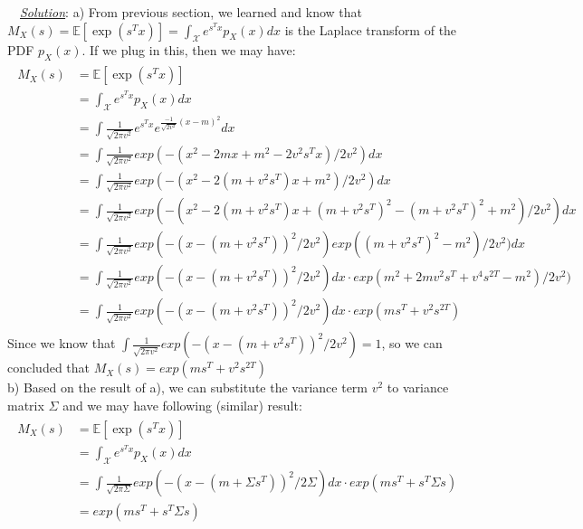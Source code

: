 \documentclass[twoside]{article}
\newenvironment{solution}{
  \begin{flushleft} \noindent ~~\underline{\emph{Solution}}: \rmfamily}{\end{flushleft}}
\newcommand\E{\mathbb{E}}
\begin{document}
\begin{solution}
a) From previous section, we learned and know that $M_X(s) = \E[\exp(s^Tx)] = \int_\mathcal{X} e^{s^Tx}p_X(x) dx$ is the Laplace transform of the PDF $p_X(x)$. If we plug in this, then we may have:
\begin{equation}
\begin{split}
\begin{aligned}
M_X(s) &= \E[\exp(s^Tx)] \\ &= \int_\mathcal{X} e^{s^Tx}p_X(x) dx 
\\ &= \int \frac{1}{\sqrt{2\pi v^2}}e^{s^Tx}e^{\frac{-1}{\sqrt{2v^2}}{(x-m)}^2}dx  
\\ &=\int \frac{1}{\sqrt{2\pi v^2}} exp(-(x^2 -2mx +m^2 - 2v^2s^Tx)/{2v^2}) dx 
\\ &= \int \frac{1}{\sqrt{2\pi v^2}} exp(-(x^2 -2(m+v^2s^T)x +m^2)/{2v^2}) dx 
\\ &= \int \frac{1}{\sqrt{2\pi v^2}} exp(-(x^2 -2(m+v^2s^T)x +(m+v^2s^T)^2 - (m+v^2s^T)^2 +m^2 )/{2v^2}) dx 
\\ &= \int \frac{1}{\sqrt{2\pi v^2}} exp(-(x -(m+v^2s^T))^2 /{2v^2}) exp((m+v^2s^T)^2 - m^2 )/{2v^2}) dx 
\\ &= \int \frac{1}{\sqrt{2\pi v^2}} exp(-(x -(m+v^2s^T))^2 /{2v^2}) dx \cdot exp(m^2+ 2m v^2s^T +v^4s^{2T} - m^2 )/{2v^2}) 
\\ &= \int \frac{1}{\sqrt{2\pi v^2}} exp(-(x -(m+v^2s^T))^2 /{2v^2}) dx \cdot exp(ms^T + v^2s^{2T}) 
\end{aligned}
\end{split}
\end{equation}
Since we know that $\int \frac{1}{\sqrt{2\pi v^2}} exp(-(x -(m+v^2s^T))^2 /{2v^2}) = 1$, so we can concluded that  $M_X(s) = exp(ms^T + v^2s^{2T}) $ \\
b) Based on the result of a), we can substitute the variance term $v^2$ to variance matrix $\Sigma$ and we may have following (similar) result: 
\begin{equation}
\begin{split}
\begin{aligned}
M_X(s) &= \E[\exp(s^Tx)] 
\\ &= \int_\mathcal{X} e^{s^Tx}p_X(x) dx 
\\ &= \int \frac{1}{\sqrt{2\pi \Sigma}} exp(-(x -(m+\Sigma s^T))^2 /{2 \Sigma}) dx \cdot exp(ms^T + s^T\Sigma s) 
\\ &= exp(ms^T + s^T\Sigma s) 
\end{aligned}
\end{split}
\end{equation}
\end{solution}
\end{document}
